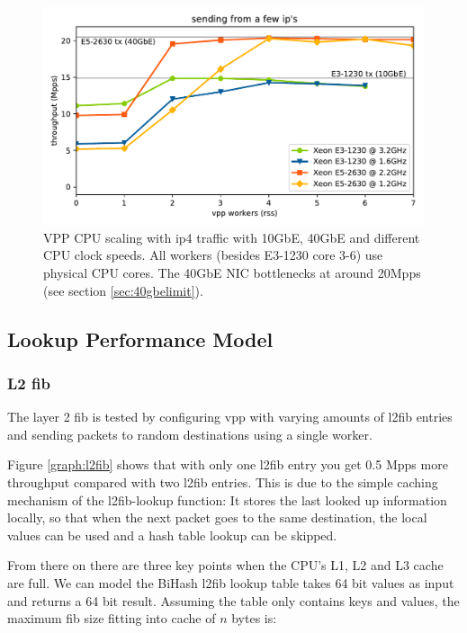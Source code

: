 \begin{figure}[!ht]
\noindent\hspace{0.5mm}\includegraphics[width=\linewidth]{pics/throughput_summary_multicore.pdf}
\caption{VPP CPU scaling with \Ac{ip4} traffic with 10GbE, 40GbE and different CPU clock speeds. All workers (besides E3-1230 core 3-6) use physical CPU cores. The 40GbE NIC bottlenecks at around 20Mpps (see section \ref{sec:40gbelimit}). }
\label{graph:multicore}
\end{figure}


\subsection{Lookup Performance Model}



\subsubsection{L2 \Ac{fib}}

The layer 2 \Ac{fib} is tested by configuring \Ac{vpp} with varying
amounts of l2fib entries and sending packets to random destinations
using a single worker.

Figure \ref{graph:l2fib} shows that with only one l2fib entry you get
0.5 Mpps more throughput compared with two l2fib entries. This is due
to the simple caching mechanism of the l2fib-lookup function: It
stores the last looked up information locally, so that when the next
packet goes to the same destination, the local values can be used and
a hash table lookup can be skipped.

From there on there are three key points when the CPU's L1, L2 and L3
cache are full. We can model the BiHash l2fib lookup table takes 64
bit values as input and returns a 64 bit result. Assuming the table
only contains keys and values, the maximum \Ac{fib} size fitting into
cache of $n$ bytes is:

